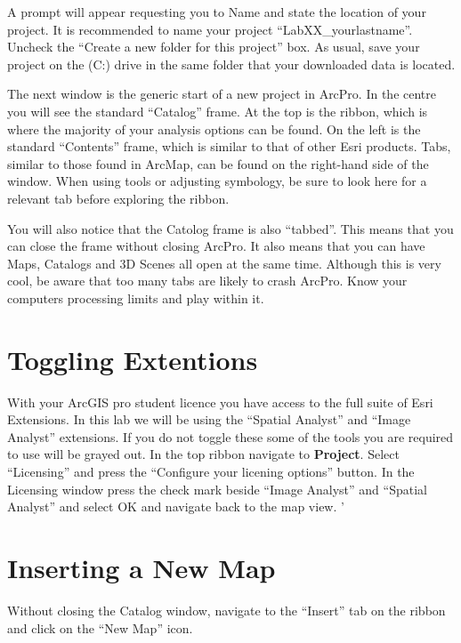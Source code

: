 \documentclass[
]{book}
\begin{document}
A prompt will appear requesting you to Name and state the location of your project. It is recommended to name your project ``LabXX\_yourlastname''. Uncheck the ``Create a new folder for this project'' box. As usual, save your project on the (C:) drive in the same folder that your downloaded data is located.

The next window is the generic start of a new project in ArcPro. In the centre you will see the standard ``Catalog'' frame. At the top is the ribbon, which is where the majority of your analysis options can be found. On the left is the standard ``Contents'' frame, which is similar to that of other Esri products. Tabs, similar to those found in ArcMap, can be found on the right-hand side of the window. When using tools or adjusting symbology, be sure to look here for a relevant tab before exploring the ribbon.

You will also notice that the Catolog frame is also ``tabbed''. This means that you can close the frame without closing ArcPro. It also means that you can have Maps, Catalogs and 3D Scenes all open at the same time. Although this is very cool, be aware that too many tabs are likely to crash ArcPro. Know your computers processing limits and play within it.

\hypertarget{toggling-extentions}{%
\section*{Toggling Extentions}\label{toggling-extentions}}

With your ArcGIS pro student licence you have access to the full suite of Esri Extensions. In this lab we will be using the ``Spatial Analyst'' and ``Image Analyst'' extensions. If you do not toggle these some of the tools you are required to use will be grayed out. In the top ribbon navigate to \textbf{Project}. Select ``Licensing'' and press the ``Configure your licening options'' button. In the Licensing window press the check mark beside ``Image Analyst'' and ``Spatial Analyst'' and select OK and navigate back to the map view. '

\hypertarget{inserting-a-new-map}{%
\section*{Inserting a New Map}\label{inserting-a-new-map}}

Without closing the Catalog window, navigate to the ``Insert'' tab on the ribbon and click on the ``New Map'' icon.
\end{document}
